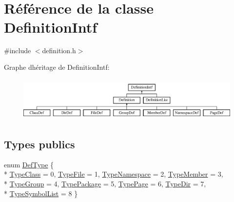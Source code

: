 \hypertarget{class_definition_intf}{}\section{Référence de la classe Definition\+Intf}
\label{class_definition_intf}


{\ttfamily \#include $<$definition.\+h$>$}

Graphe d\textquotesingle{}héritage de Definition\+Intf\+:\begin{figure}[H]
\begin{center}
\leavevmode
\includegraphics[height=2.264151cm]{class_definition_intf}
\end{center}
\end{figure}
\subsection*{Types publics}
\begin{DoxyCompactItemize}
\item 
enum \hyperlink{class_definition_intf_ada60114bc621669dd8c19edfc6421766}{Def\+Type} \{ \\*
\hyperlink{class_definition_intf_ada60114bc621669dd8c19edfc6421766a8c7123ce45e6d365a610ed3951ecd037}{Type\+Class} = 0, 
\hyperlink{class_definition_intf_ada60114bc621669dd8c19edfc6421766a92fb29a1b73c05c1a21b5936f262085d}{Type\+File} = 1, 
\hyperlink{class_definition_intf_ada60114bc621669dd8c19edfc6421766ac1833ce9fc94097a64c0c60104ac3297}{Type\+Namespace} = 2, 
\hyperlink{class_definition_intf_ada60114bc621669dd8c19edfc6421766a77974c3635270f07d38ff920fd8f653c}{Type\+Member} = 3, 
\\*
\hyperlink{class_definition_intf_ada60114bc621669dd8c19edfc6421766a7ae77e43166a87eaa59e89dc7d0e2917}{Type\+Group} = 4, 
\hyperlink{class_definition_intf_ada60114bc621669dd8c19edfc6421766ab55dda7065ddf21d823d89a00c23063b}{Type\+Package} = 5, 
\hyperlink{class_definition_intf_ada60114bc621669dd8c19edfc6421766a20cfcea557f83381dbdcca5ede9185a8}{Type\+Page} = 6, 
\hyperlink{class_definition_intf_ada60114bc621669dd8c19edfc6421766ad9e85c8933bcb049693ec8c02fd774fe}{Type\+Dir} = 7, 
\\*
\hyperlink{class_definition_intf_ada60114bc621669dd8c19edfc6421766a2dfe7456f05b8bf08f04de5c5f8788a7}{Type\+Symbol\+List} = 8
 \}
\end{DoxyCompactItemize}
